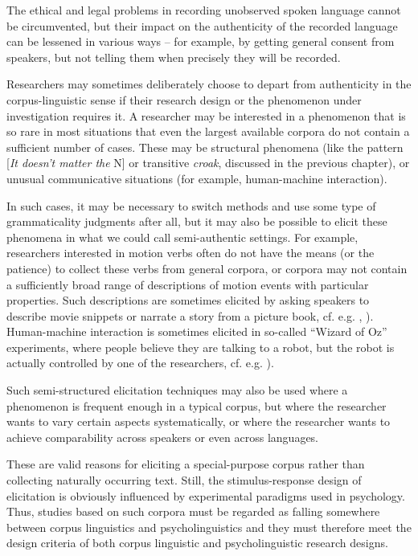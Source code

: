 The ethical and legal problems in recording unobserved spoken language cannot be circumvented, but their impact on the authenticity of the recorded language can be lessened in various ways -- for example, by getting general consent from speakers, but not telling them when precisely they will be recorded.

Researchers may sometimes deliberately choose to depart from authenticity in the corpus-linguistic sense if their research design or the phenomenon under investigation requires it. A researcher may be interested in a phenomenon that is so rare in most situations that even the largest available corpora do not contain a sufficient number of cases. These may be structural phenomena (like the pattern [\textit{It doesn't matter the} N] or transitive \textit{croak}, discussed in the previous chapter), or unusual communicative situations (for example, human-machine interaction).

In such cases, it may be necessary to switch methods and use some type of grammaticality judgments after all, but it may also be possible to elicit these phenomena in what we could call semi-authentic settings. For example, researchers interested in motion verbs often do not have the means (or the patience) to collect these verbs from general corpora, or corpora may not contain a sufficiently broad range of descriptions of motion events with particular properties. Such descriptions are sometimes elicited by asking speakers to describe movie snippets or narrate a story from a picture book, cf. e.g. \citealt{berman_relating_1994}, \citealt{stromqvist_relating_2003}). Human-machine interaction is sometimes elicited in so-called ``Wizard of Oz'' experiments, where people believe they are talking to a robot, but the robot is actually controlled by one of the researchers, cf. e.g. \citealt{georgila_match_2010}).

Such semi-structured elicitation techniques may also be used where a phenomenon is frequent enough in a typical corpus, but where the researcher wants to vary certain aspects systematically, or where the researcher wants to achieve comparability across speakers or even across languages.

These are valid reasons for eliciting a special-purpose corpus rather than collecting naturally occurring text. Still, the stimulus-response design of elicitation is obviously influenced by experimental paradigms used in psychology. Thus, studies based on such corpora must be regarded as falling somewhere between corpus linguistics and psycholinguistics and they must therefore meet the design criteria of both corpus linguistic and psycholinguistic research designs.

